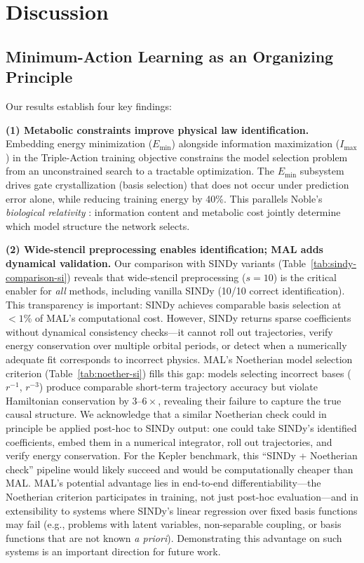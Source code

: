 \documentclass[9pt,twocolumn,twoside]{pnas-new}
\begin{document}
\section*{Discussion}

\subsection*{Minimum-Action Learning as an Organizing Principle}
Our results establish four key findings:

\textbf{(1) Metabolic constraints improve physical law identification.} Embedding energy minimization ($E_{\min}$) alongside information maximization ($I_{\max}$) in the Triple-Action training objective constrains the model selection problem from an unconstrained search to a tractable optimization. The $E_{\mathrm{min}}$ subsystem drives gate crystallization (basis selection) that does not occur under prediction error alone, while reducing training energy by 40\%. This parallels Noble's \textit{biological relativity} \cite{Noble2012}: information content and metabolic cost jointly determine which model structure the network selects.

\textbf{(2) Wide-stencil preprocessing enables identification; MAL adds dynamical validation.} Our comparison with SINDy variants (Table~\ref{tab:sindy-comparison-si}) reveals that wide-stencil preprocessing ($s=10$) is the critical enabler for \textit{all} methods, including vanilla SINDy (10/10 correct identification). This transparency is important: SINDy achieves comparable basis selection at $<1$\% of MAL's computational cost. However, SINDy returns sparse coefficients without dynamical consistency checks---it cannot roll out trajectories, verify energy conservation over multiple orbital periods, or detect when a numerically adequate fit corresponds to incorrect physics. MAL's Noetherian model selection criterion (Table~\ref{tab:noether-si}) fills this gap: models selecting incorrect bases ($r^{-1}$, $r^{-3}$) produce comparable short-term trajectory accuracy but violate Hamiltonian conservation by $3$--$6\times$, revealing their failure to capture the true causal structure. We acknowledge that a similar Noetherian check could in principle be applied post-hoc to SINDy output: one could take SINDy's identified coefficients, embed them in a numerical integrator, roll out trajectories, and verify energy conservation. For the Kepler benchmark, this ``SINDy + Noetherian check'' pipeline would likely succeed and would be computationally cheaper than MAL. MAL's potential advantage lies in end-to-end differentiability---the Noetherian criterion participates in training, not just post-hoc evaluation---and in extensibility to systems where SINDy's linear regression over fixed basis functions may fail (e.g., problems with latent variables, non-separable coupling, or basis functions that are not known \textit{a priori}). Demonstrating this advantage on such systems is an important direction for future work.
\end{document}
